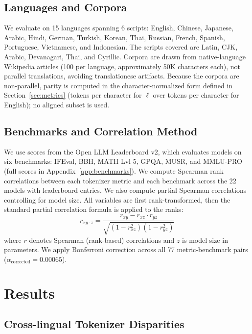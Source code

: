 \documentclass[11pt]{article}
\begin{document}
\subsection{Languages and Corpora}
\label{sec:corpora}

We evaluate on 15 languages spanning 6 scripts: English, Chinese, Japanese, Arabic, Hindi, German, Turkish, Korean, Thai, Russian, French, Spanish, Portuguese, Vietnamese, and Indonesian. The scripts covered are Latin, CJK, Arabic, Devanagari, Thai, and Cyrillic. Corpora are drawn from native-language Wikipedia articles (100 per language, approximately 50K characters each), not parallel translations, avoiding translationese artifacts. Because the corpora are non-parallel, parity is computed in the character-normalized form defined in Section~\ref{sec:metrics} (tokens per character for $\ell$ over tokens per character for English); no aligned subset is used.

\subsection{Benchmarks and Correlation Method}

We use scores from the Open LLM Leaderboard v2, which evaluates models on six benchmarks: IFEval, BBH, MATH Lvl 5, GPQA, MUSR, and MMLU-PRO (full scores in Appendix~\ref{app:benchmarks}). We compute Spearman rank correlations between each tokenizer metric and each benchmark across the 22 models with leaderboard entries. We also compute partial Spearman correlations controlling for model size. All variables are first rank-transformed, then the standard partial correlation formula is applied to the ranks:
\begin{equation}
    r_{xy \cdot z} = \frac{r_{xy} - r_{xz} \cdot r_{yz}}{\sqrt{(1-r_{xz}^2)(1-r_{yz}^2)}}
\end{equation}
where $r$ denotes Spearman (rank-based) correlations and $z$ is model size in parameters. We apply Bonferroni correction across all 77 metric-benchmark pairs ($\alpha_\text{corrected} = 0.00065$).

\section{Results}

\subsection{Cross-lingual Tokenizer Disparities}
\end{document}
